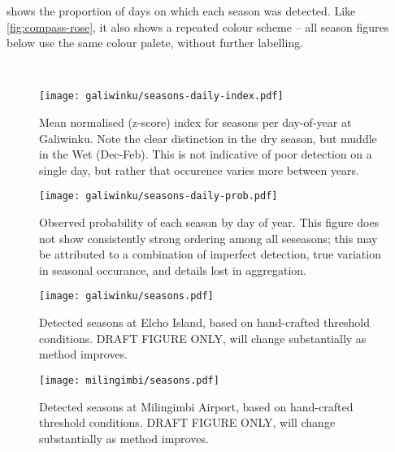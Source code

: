  shows the proportion of days on which
each season was detected.  Like \cref{fig:compass-rose}, it also
shows a repeated colour scheme -- all season figures below use the
same colour palete, without further labelling.

~\\



\begin{figure}[h]
    \centering
    \texttt{[image: galiwinku/seasons-daily-index.pdf]}
    \caption[Season index by day-of-year, Elcho Island]{
        Mean normalised (z-score) index for seasons per day-of-year
        at Galiwinku.  Note the clear distinction in the dry season,
        but muddle in the Wet (Dec-Feb).
        This is not indicative of poor detection on a single day,
        but rather that occurence varies more between years.
        }
    \label{fig:season-daily-index}
\end{figure}
%
\begin{figure}[h]
    \centering
    \texttt{[image: galiwinku/seasons-daily-prob.pdf]}
    \caption[Season probability by day-of-year, Elcho Island]{
        Observed probability of each season by day of year.
        This figure does not show consistently strong ordering among all
        seseasons; this may be attributed to a combination of imperfect
        detection, true variation in seasonal occurance, and details
        lost in aggregation.
        }
    \label{fig:season-daily-prob}
\end{figure}




\begin{figure}[p]
    \centering
    \texttt{[image: galiwinku/seasons.pdf]}
    \caption[Detected seasons for Elcho Island]{
        Detected seasons at Elcho Island, based on hand-crafted threshold conditions.
        DRAFT FIGURE ONLY, will change substantially as method improves.
        }
    \label{fig:galiwinku-seasons}
\end{figure}
\begin{figure}[p]
    \centering
    \texttt{[image: milingimbi/seasons.pdf]}
    \caption[Detected seasons for Milingimbi Airport]{
        Detected seasons at Milingimbi Airport, based on hand-crafted threshold conditions.
        DRAFT FIGURE ONLY, will change substantially as method improves.
        }
    \label{fig:milingimbi-seasons}
\end{figure}


